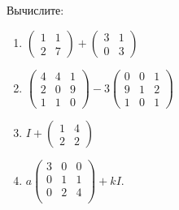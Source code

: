 \documentclass[11pt, a4paper]{extarticle}
\begin{document}
\subsection{}
Вычислите:
\begin{multicols}{2}
	\begin{enumerate}[label=\alph*)]
		\item $\begin{pmatrix}
		1 & 1 \\
		2 & 7 
		\end{pmatrix} + \begin{pmatrix}
		3 & 1 \\
		0 & 3
		\end{pmatrix}$
		
		\item $\begin{pmatrix}
		4 & 4 & 1 \\
		2 & 0 & 9 \\
		1 & 1 & 0
		\end{pmatrix} - 3\begin{pmatrix}
		0 & 0 & 1 \\
		9 & 1 & 2 \\
		1 & 0 & 1
		\end{pmatrix}$
		
		\item $ I + \begin{pmatrix}
		1 & 4 \\
		2 & 2
		\end{pmatrix}$
		
		\item $a \begin{pmatrix}
		3 & 0 & 0 \\
		0 & 1 & 1 \\
		0 & 2 & 4 \\
		\end{pmatrix} + kI$.
	\end{enumerate}
\end{multicols}
\end{document}
